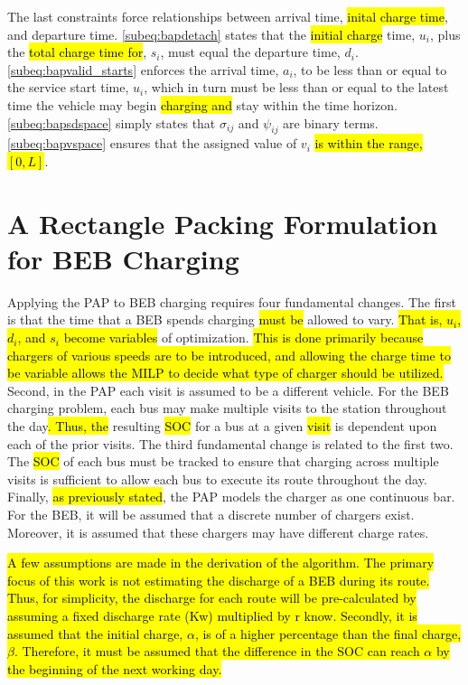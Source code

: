 \documentclass[utf8]{FrontiersinHarvard}
\begin{document}
The last constraints force relationships between arrival time, \hl{inital charge time}, and departure time.
\autoref{subeq:bapdetach} states that the \hl{ initial charge} time, \(u_i\), plus the \hl{total charge time for}, \(s_i\), must equal the departure time, \(d_i\). \autoref{subeq:bapvalid_starts} enforces the arrival
time, \(a_i\), to be less than or equal to the service start time, \(u_i\), which in turn must be less than or equal to the
latest time the vehicle may begin \hl{charging and} stay within the time horizon. \autoref{subeq:bapsdspace}
simply states that \(\sigma_{ij}\) and \(\psi_{ij}\) are binary terms. \autoref{subeq:bapvspace} ensures that the assigned value of
\(v_i\) \hl{is within the range, $[0,L]$}.
\section{A Rectangle Packing Formulation for BEB Charging}
\label{sec:problemformulation}
Applying the PAP to BEB charging requires four fundamental changes. The first is that the time that a BEB spends
charging \hl{must be} allowed to vary. \hl{That is, $u_i$, $d_i$, and $s_i$ become variables} of
optimization. \hl{This is done primarily because chargers of various speeds are to be introduced, and allowing the charge time to be variable allows the MILP to decide what type of charger should be utilized.} Second, in the PAP
each visit is assumed to be a different vehicle. For the BEB charging problem, each bus may make multiple visits to the
station throughout the day\hl{. Thus, the} resulting \hl{SOC} for a bus at a given \hl{visit} is
dependent upon each of the prior visits. The third fundamental change is related to the first two. The
\hl{SOC} of each bus must be tracked to ensure that charging across multiple visits is sufficient to allow
each bus to execute its route throughout the day. Finally, \hl{as previously stated}, the PAP models the
charger as one continuous bar. For the BEB, it will be assumed that a discrete number of chargers exist. Moreover, it is
assumed that these chargers may have different charge rates.

\hl{A few assumptions are made in the derivation of the algorithm. The primary focus of this work is not estimating the
  discharge of a BEB during its route. Thus, for simplicity, the discharge for each route will be pre-calculated by
  assuming a fixed discharge rate (Kw) multiplied by r know. Secondly, it is assumed that the initial charge, $\alpha$,
  is of a higher percentage than the final charge, $\beta$. Therefore, it must be assumed that the difference in the SOC
  can reach $\alpha$ by the beginning of the next working day.}
\end{document}

